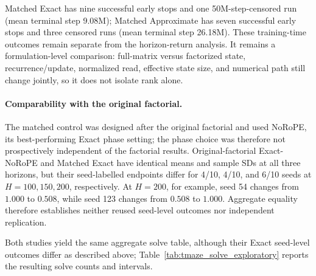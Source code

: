 Matched Exact has nine successful early stops and one 50M-step-censored run (mean terminal step 9.08M); Matched Approximate has seven successful early stops and three censored runs (mean terminal step 26.18M). These training-time outcomes remain separate from the horizon-return analysis. It remains a formulation-level comparison: full-matrix versus factorized state, recurrence/update, normalized read, effective state size, and numerical path still change jointly, so it does not isolate rank alone.

\paragraph{Comparability with the original factorial.}
The matched control was designed after the original factorial and used NoRoPE, its best-performing Exact phase setting; the phase choice was therefore not prospectively independent of the factorial results. Original-factorial Exact-NoRoPE and Matched Exact have identical means and sample SDs at all three horizons, but their seed-labelled endpoints differ for 4/10, 4/10, and 6/10 seeds at $H=100,150,200$, respectively. At $H=200$, for example, seed 54 changes from $1.000$ to $0.508$, while seed 123 changes from $0.508$ to $1.000$. Aggregate equality therefore establishes neither reused seed-level outcomes nor independent replication.

\begin{table}[H]
\centering\small

\caption{\textbf{Exploratory T-Maze solve summaries at $H=200$.} A seed is solved when its terminal deterministic evaluation success proportion is at least $0.90$. Brackets are Wilson 95\% intervals for each proportion; Fisher tests are two-sided independent-condition comparisons. These post hoc threshold analyses are pointwise, unadjusted, and supplementary to the primary continuous-return contrasts.}
\label{tab:tmaze_solve_exploratory}
\end{table}

Both studies yield the same aggregate solve table, although their Exact seed-level outcomes differ as described above; Table~\ref{tab:tmaze_solve_exploratory} reports the resulting solve counts and intervals.

